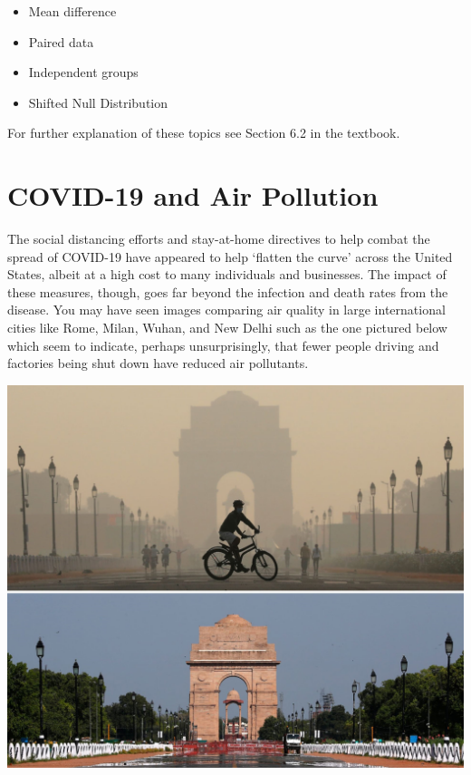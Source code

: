 \documentclass[
]{report}
\begin{document}
\begin{itemize}
\item
  Mean difference
\item
  Paired data
\item
  Independent groups
\item
  Shifted Null Distribution
\end{itemize}

For further explanation of these topics see Section 6.2 in the textbook.

\hypertarget{covid-19-and-air-pollution}{%
\section{COVID-19 and Air Pollution}\label{covid-19-and-air-pollution}}

The social distancing efforts and stay-at-home directives to help combat the spread of COVID-19 have appeared to help `flatten the curve' across the United States, albeit at a high cost to many individuals and businesses. The impact of these measures, though, goes far beyond the infection and death rates from the disease. You may have seen images comparing air quality in large international cities like Rome, Milan, Wuhan, and New Delhi such as the one pictured below which seem to indicate, perhaps unsurprisingly, that fewer people driving and factories being shut down have reduced air pollutants.

\includegraphics{images/air_pollution.png}
\end{document}
